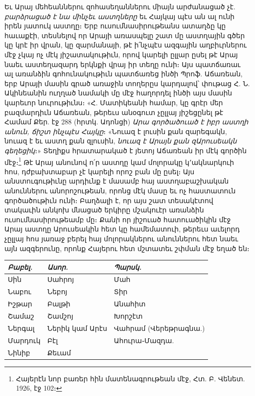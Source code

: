 \documentclass{article}
\begin{document}
{Եւ Արայ մեհեաններու զոհասեղաններու միայն արժանացած չէ. \emph{բարձրացած է նա մինչեւ աստղները} եւ Հայկայ պէս ան ալ ունի իրեն յատուկ աստղը։ Երբ ուսումնասիրութեանս ատաղձը կը հաւաքէի, տեսնելով որ Արայի առասպելը շատ մը աստղային գծեր կը կրէ իր վրան, կը զարմանայի, թէ ի՛նչպէս ազգային աղբիւրներու մէջ չկայ ոչ մէկ յիշատակութիւն, որով կարելի ըլլար ըսել թէ Արայ նաեւ աստեղազարդ երկնքի վրայ իր տեղը ունի։ Այս պատճառաւ ալ առանձին գոհունակութիւն պատճառեց ինծի Պրոֆ. Աճառեան, երբ Արայի մասին գրած առաջին տողերըս կարդալով՝ փութաց Հ. Ն. Ակինեանին ուղղած նամակի մը մէջ հաղորդել ինծի այս մասին կարեւոր նուրութիւնս։ «Հ. Մատիկեանի համար, կը գրէր մեր բազմարդիւն Աճառեան, թերեւս անօգուտ չըլլայ յիշեցընել թէ Համամ Քեր. էջ 288 (հրտկ. Ադոնցի) \emph{Արա գործածուած է իբր աստղի անուն, ճիշտ ինչպէս Հայկը}։ «Նուազ է լուսին քան զարեգակն, նուազ է եւ աստղ քան զլուսին, \emph{նուազ է Արայն քան զԱրուսեակն գեղեցիկ}։» Տեղիքս հրատարակած է յետոյ Աճառեան իր մէկ գործին մէջ։\footnote{Հայերէն նոր բառեր հին մատենագրութեան մէջ, Հտ. Բ. Վենետ. 1926, էջ 102։} Թէ Արայ անունով ո՛ր աստղը կամ մոլորակը կ՚ակնարկուի հոս, դժբախտաբար չէ կարելի որոշ բան մը ըսել։ Այս անստուգութիւնը արդիւնք է մասամբ հայ աստղաբաշխական անուններու անորոշութեան, որոնց մէկ մասը եւ ոչ հաստատուն գործածութիւն ունի։ Բաղձալի է, որ այս շատ տեսակէտով տակաւին անկոխ մնացած երկիրը մշակուէր առանձին ուսումնասիրութեամբ մը։ Քանի որ յիշուած հատուածիկին մէջ Արայ աստղը Արուսեակին հետ կը համեմատուի, թերեւս աւելորդ չըլլայ հոս յառաջ բերել հայ մոլորակներու անուններու հետ նաեւ այն ազգերունը, որոնք Հայերու հետ մշտատեւ շփման մէջ եղած են։}

\begin{table}[H]
    \centering
    \arm
    \small
    \begin{tabular}{l l l}
        \emph{Բաբել.}  &  \emph{Ասոր.}         &  \emph{Պարսկ.}              \\ \hline
         Սին       &  Սահրոյ          &  Մահ                   \\
         Նաբու     &  Նեբոյ           &  Տիր                   \\ 
         Իշթար     &  Բալթի           &  Անահիտ                \\ 
         Շամաշ     &  Շամշոյ          &  Խորշէտ                \\
         Ներգալ    &  Ներիկ կամ Արէս  &  Վահրամ (Վերեթրագնա.)  \\ 
         Մարդուկ   &  Բէլ             &  Ահուրա֊Մազդա.         \\
         Նինիբ     &  Քեւամ           & ~ \\
    \end{tabular}
\end{table}
\end{document}
